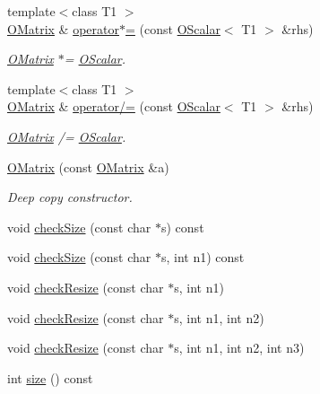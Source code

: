 \begin{DoxyCompactItemize}
{\footnotesize template$<$class T1 $>$ }\\\mbox{\hyperlink{classENSEM_1_1OMatrix}{O\+Matrix}} \& \mbox{\hyperlink{classENSEM_1_1OMatrix_a40e18b83c9eb609f7529e65c515010c2}{operator$\ast$=}} (const \mbox{\hyperlink{classENSEM_1_1OScalar}{O\+Scalar}}$<$ T1 $>$ \&rhs)
\begin{DoxyCompactList}\small\item\em \mbox{\hyperlink{classENSEM_1_1OMatrix}{O\+Matrix}} $\ast$= \mbox{\hyperlink{classENSEM_1_1OScalar}{O\+Scalar}}. \end{DoxyCompactList}\item 
{\footnotesize template$<$class T1 $>$ }\\\mbox{\hyperlink{classENSEM_1_1OMatrix}{O\+Matrix}} \& \mbox{\hyperlink{classENSEM_1_1OMatrix_a46dc90e0e33442dcdcb9e98f9cf0025e}{operator/=}} (const \mbox{\hyperlink{classENSEM_1_1OScalar}{O\+Scalar}}$<$ T1 $>$ \&rhs)
\begin{DoxyCompactList}\small\item\em \mbox{\hyperlink{classENSEM_1_1OMatrix}{O\+Matrix}} /= \mbox{\hyperlink{classENSEM_1_1OScalar}{O\+Scalar}}. \end{DoxyCompactList}\item 
\mbox{\hyperlink{classENSEM_1_1OMatrix_a695677059e35f7e9933f2b55d2eacb52}{O\+Matrix}} (const \mbox{\hyperlink{classENSEM_1_1OMatrix}{O\+Matrix}} \&a)
\begin{DoxyCompactList}\small\item\em Deep copy constructor. \end{DoxyCompactList}\item 
void \mbox{\hyperlink{classENSEM_1_1OMatrix_abec80929ab7e8e2a23822fbbc841bd87}{check\+Size}} (const char $\ast$s) const
\item 
void \mbox{\hyperlink{classENSEM_1_1OMatrix_a8e4c3a86b8055f6e67c8fd914b2898ca}{check\+Size}} (const char $\ast$s, int n1) const
\item 
void \mbox{\hyperlink{classENSEM_1_1OMatrix_a04fb9c7a5ca8da8a54aff3a8bafec571}{check\+Resize}} (const char $\ast$s, int n1)
\item 
void \mbox{\hyperlink{classENSEM_1_1OMatrix_aa9d9ff7da2027f85535b36b472ef125b}{check\+Resize}} (const char $\ast$s, int n1, int n2)
\item 
void \mbox{\hyperlink{classENSEM_1_1OMatrix_a532d2138ecffc7a153b831401ca8b4df}{check\+Resize}} (const char $\ast$s, int n1, int n2, int n3)
\item 
int \mbox{\hyperlink{classENSEM_1_1OMatrix_a837821b951450cd49d3db25f566f5e47}{size}} () const

\end{DoxyCompactItemize}
